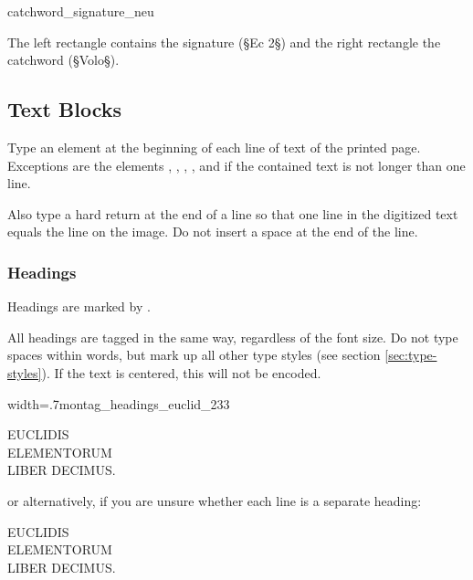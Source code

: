 \begin{sampleImage}{catchword_signature_neu}

\notTranscribed

The left rectangle contains the signature (§Ec 2§) and the right rectangle the catchword (§Volo§).
\end{sampleImage}


\tocspace
\subsection{Text Blocks}
\label{textblocks}
\begin{mainrule}
Type an  element at the beginning of each line of text of the printed page. Exceptions are the elements , , , ,  and  if the contained text is not longer than one line.
\end{mainrule}

\begin{clarification}
Also type a hard return at the end of a line so that one line in the digitized text equals the line on the image. Do not insert a space at the end of the line.
\end{clarification}

\subsubsection{Headings}
\label{section headings}

\begin{mainrule}
Headings are marked by .
\end{mainrule}

\begin{clarification}
All headings are tagged in the same way, regardless of the font size. Do not type spaces within words, but mark up all other type styles (see section \ref{sec:type-styles}). If the text is centered, this will not be encoded.
\end{clarification}

\begin{sampleImageSmall}{width=.7\linewidth}{montag_headings_euclid_233}
\begin{typeLatin}
EUCLIDIS \\
ELEMENTORUM \\
LIBER DECIMUS.
\end{typeLatin}
or alternatively, if you are unsure whether each line is a separate heading:
\begin{typeLatin}
EUCLIDIS \\
ELEMENTORUM \\
LIBER DECIMUS.
\end{typeLatin}
\end{sampleImageSmall}


